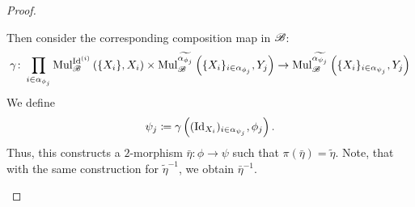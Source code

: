 \begin{proof}
\begin{enumerate}
\begin{center}
        \end{center}
        Then consider the corresponding composition map in $\mathscr{B}$:
        \[
            \gamma \colon \prod_{i \in \alpha_{\phi_j}} \operatorname{Mul}_{\mathscr{B}}^{\operatorname{Id}^{(i)}}\left(\{X_i\}, X_i\right) \times \operatorname{Mul}_{\mathscr{B}}^{\widetilde{\alpha_{\phi_j}}}\left(\{X_i\}_{i \in \alpha_{\phi_j}}, Y_j\right) \to \operatorname{Mul}_{\mathscr{B}}^{\widetilde{\alpha_{\psi_j}}}\left(\{X_i\}_{i \in \alpha_{\psi_j}}, Y_j\right)
        \]
        We define
        \[
            \psi_j \coloneqq \gamma\left((\operatorname{Id}_{X_i})_{i \in \alpha_{\psi_j}}, \phi_j\right).
        \]
        Thus, this constructs a $2$-morphism $\bar{\eta} \colon \phi \to \psi$ such that $\pi(\bar{\eta}) = \widetilde{\eta}$.
        Note, that with the same construction for $\widetilde{\eta}^{-1}$, we obtain $\bar{\eta}^{-1}$.

\end{enumerate}
\end{proof}
